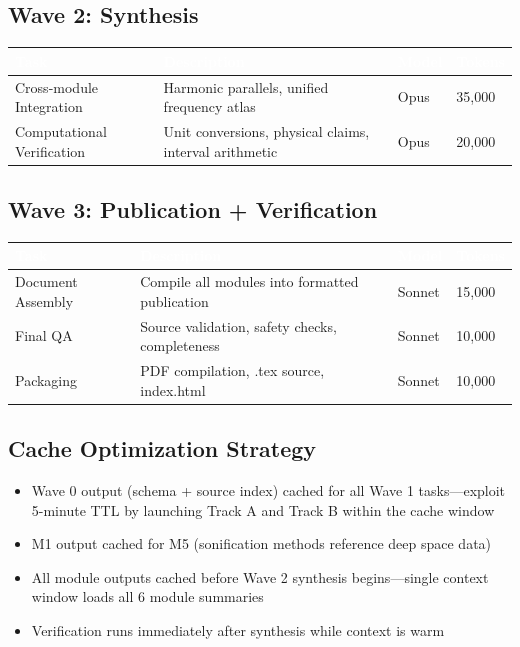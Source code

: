 \documentclass[11pt,letterpaper]{article}
\newcommand{\tableheader}[1]{\textbf{\sffamily\textcolor{white}{#1}}}
\begin{document}
\subsection{Wave 2: Synthesis}

\begin{center}
\begin{tabularx}{\textwidth}{L{3.5cm}XC{1.5cm}C{2cm}}
\toprule
{}
\tableheader{Task} & \tableheader{Description} & \tableheader{Model} & \tableheader{Tokens} \\
\midrule
Cross-module Integration & Harmonic parallels, unified frequency atlas & Opus & 35,000 \\
Computational Verification & Unit conversions, physical claims, interval arithmetic & Opus & 20,000 \\
\bottomrule
\end{tabularx}
\end{center}

\subsection{Wave 3: Publication + Verification}

\begin{center}
\begin{tabularx}{\textwidth}{L{3.5cm}XC{1.5cm}C{2cm}}
\toprule
{}
\tableheader{Task} & \tableheader{Description} & \tableheader{Model} & \tableheader{Tokens} \\
\midrule
Document Assembly & Compile all modules into formatted publication & Sonnet & 15,000 \\
Final QA & Source validation, safety checks, completeness & Sonnet & 10,000 \\
Packaging & PDF compilation, .tex source, index.html & Sonnet & 10,000 \\
\bottomrule
\end{tabularx}
\end{center}

\subsection{Cache Optimization Strategy}

\begin{itemize}[leftmargin=2em]
\item Wave 0 output (schema + source index) cached for all Wave 1 tasks---exploit 5-minute TTL by launching Track A and Track B within the cache window
\item M1 output cached for M5 (sonification methods reference deep space data)
\item All module outputs cached before Wave 2 synthesis begins---single context window loads all 6 module summaries
\item Verification runs immediately after synthesis while context is warm
\end{itemize}
\end{document}
